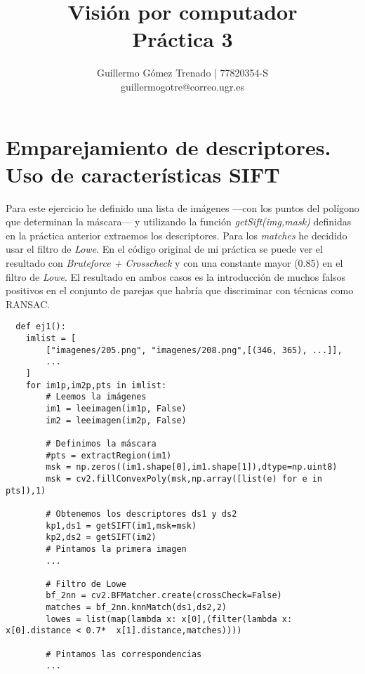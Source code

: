 \documentclass{article}
\title{Visión por computador\\
Práctica 3}
\author{Guillermo G\'omez Trenado | 77820354-S \\
guillermogotre@correo.ugr.es}
\begin{document}

\maketitle

\tableofcontents

\newpage

\section{Emparejamiento de descriptores. Uso de características SIFT}

Para este ejercicio he definido una lista de imágenes ---con los puntos del polígono que determinan la máscara--- y utilizando la función \textit{getSift(img,mask)} definidas en la práctica anterior extraemos los descriptores. Para los \textit{matches} he decidido usar el filtro de \textit{Lowe}. En el código original de mi práctica se puede ver el resultado con \textit{Bruteforce + Crosscheck} y con una constante mayor (0.85) en el filtro de \textit{Lowe}. El resultado en ambos casos es la introducción de muchos falsos positivos en el conjunto de parejas que habría que discriminar con técnicas como RANSAC.

\begin{verbatim}
  def ej1():
    imlist = [
        ["imagenes/205.png", "imagenes/208.png",[(346, 365), ...]],
        ...
    ]
    for im1p,im2p,pts in imlist:
        # Leemos la imágenes
        im1 = leeimagen(im1p, False)
        im2 = leeimagen(im2p, False)
		
        # Definimos la máscara
        #pts = extractRegion(im1)
        msk = np.zeros((im1.shape[0],im1.shape[1]),dtype=np.uint8)
        msk = cv2.fillConvexPoly(msk,np.array([list(e) for e in pts]),1)
        
        # Obtenemos los descriptores ds1 y ds2
        kp1,ds1 = getSIFT(im1,msk=msk)
        kp2,ds2 = getSIFT(im2)
        # Pintamos la primera imagen
        ...

        # Filtro de Lowe
        bf_2nn = cv2.BFMatcher.create(crossCheck=False)
        matches = bf_2nn.knnMatch(ds1,ds2,2)
        lowes = list(map(lambda x: x[0],(filter(lambda x: x[0].distance < 0.7*  x[1].distance,matches))))
		
        # Pintamos las correspondencias
        ...
\end{verbatim}
\end{document}
